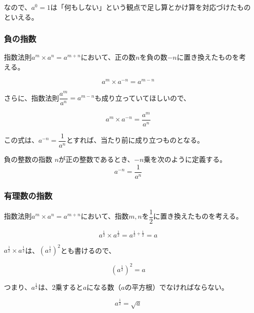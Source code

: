 \documentclass[../math-imaging]{subfiles}
\begin{document}
なので、$a^0 = 1$は「何もしない」という観点で足し算とかけ算を対応づけたものといえる。

\subsubsection{負の指数}

指数法則$a^m \times a^n = a^{m+n}$において、正の数$n$を負の数$-n$に置き換えたものを考える。

\begin{equation}
  a^m \times a^{-n} = a^{m-n}
\end{equation}

さらに、指数法則$\dfrac{a^m}{a^n} = a^{m-n}$も成り立っていてほしいので、

\begin{equation}
  a^m \times a^{-n} = \dfrac{a^m}{a^n}
\end{equation}

この式は、$a^{-n}= \dfrac{1}{a^n}$とすれば、当たり前に成り立つものとなる。

\begin{definition}{負の整数の指数}
  \newline
  $n$が正の整数であるとき、$-n$乗を次のように定義する。
  \LARGE
  \begin{equation}
    a^{-n} = \dfrac{1}{a^n}
  \end{equation}
\end{definition}

\subsubsection{有理数の指数}

指数法則$a^m \times a^n = a^{m+n}$において、指数$m, n$を$\dfrac{1}{2}$に置き換えたものを考える。

\begin{equation}
  a^{\frac{1}{2}} \times a^{\frac{1}{2}} = a^{\frac{1}{2} + \frac{1}{2}} = a
\end{equation}

$a^{\frac{1}{2}} \times a^{\frac{1}{2}}$は、$(a^{\frac{1}{2}})^2$とも書けるので、

\begin{equation}
  (a^{\frac{1}{2}})^2 = a
\end{equation}

つまり、$a^{\frac{1}{2}}$は、2乗すると$a$になる数（$a$の平方根）でなければならない。

\begin{equation}
  a^{\frac{1}{2}} = \sqrt{a}
\end{equation}
\end{document}
